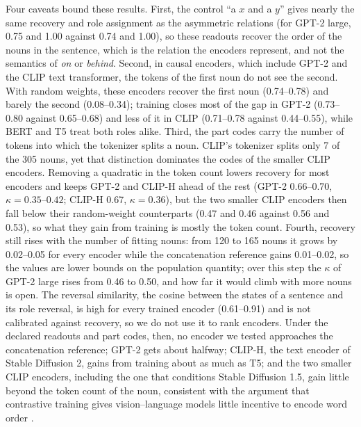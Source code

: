 \documentclass[10pt]{article}
\theoremstyle{plain}
\theoremstyle{remark}
\begin{document}
Four caveats bound these results. First, the control ``a $x$ and a $y$'' gives nearly the same recovery and role assignment as the asymmetric relations (for GPT-2 large, 0.75 and 1.00 against 0.74 and 1.00), so these readouts recover the order of the nouns in the sentence, which is the relation the encoders represent, and not the semantics of \emph{on} or \emph{behind}. Second, in causal encoders, which include GPT-2 and the CLIP text transformer, the tokens of the first noun do not see the second. With random weights, these encoders recover the first noun (0.74--0.78) and barely the second (0.08--0.34); training closes most of the gap in GPT-2 (0.73--0.80 against 0.65--0.68) and less of it in CLIP (0.71--0.78 against 0.44--0.55), while BERT and T5 treat both roles alike. Third, the part codes carry the number of tokens into which the tokenizer splits a noun. CLIP's tokenizer splits only 7 of the 305 nouns, yet that distinction dominates the codes of the smaller CLIP encoders. Removing a quadratic in the token count lowers recovery for most encoders and keeps GPT-2 and CLIP-H ahead of the rest (GPT-2 0.66--0.70, $\kappa = 0.35$--$0.42$; CLIP-H 0.67, $\kappa = 0.36$), but the two smaller CLIP encoders then fall below their random-weight counterparts (0.47 and 0.46 against 0.56 and 0.53), so what they gain from training is mostly the token count. Fourth, recovery still rises with the number of fitting nouns: from 120 to 165 nouns it grows by 0.02--0.05 for every encoder while the concatenation reference gains 0.01--0.02, so the values are lower bounds on the population quantity; over this step the $\kappa$ of GPT-2 large rises from 0.46 to 0.50, and how far it would climb with more nouns is open. The reversal similarity, the cosine between the states of a sentence and its role reversal, is high for every trained encoder (0.61--0.91) and is not calibrated against recovery, so we do not use it to rank encoders. Under the declared readouts and part codes, then, no encoder we tested approaches the concatenation reference; GPT-2 gets about halfway; CLIP-H, the text encoder of Stable Diffusion 2, gains from training about as much as T5; and the two smaller CLIP encoders, including the one that conditions Stable Diffusion 1.5, gain little beyond the token count of the noun, consistent with the argument that contrastive training gives vision--language models little incentive to encode word order \citep{yuksekgonul2023}.
\end{document}
